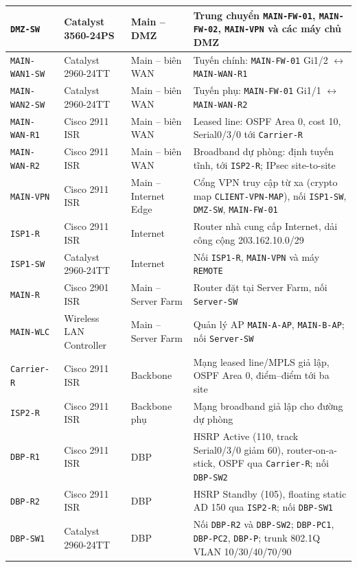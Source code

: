 \begin{small}
\begin{longtable}{|p{2.5cm}|p{2.6cm}|p{2.7cm}|p{6.0cm}|}
\texttt{DMZ-SW} & Catalyst 3560-24PS & Main -- DMZ & Trung chuyển \texttt{MAIN-FW-01}, \texttt{MAIN-FW-02}, \texttt{MAIN-VPN} và các máy chủ DMZ \\ \hline
\texttt{MAIN-WAN1-SW} & Catalyst 2960-24TT & Main -- biên WAN & Tuyến chính: \texttt{MAIN-FW-01} Gi1/2 $\leftrightarrow$ \texttt{MAIN-WAN-R1} \\ \hline
\texttt{MAIN-WAN2-SW} & Catalyst 2960-24TT & Main -- biên WAN & Tuyến phụ: \texttt{MAIN-FW-01} Gi1/1 $\leftrightarrow$ \texttt{MAIN-WAN-R2} \\ \hline
\texttt{MAIN-WAN-R1} & Cisco 2911 ISR & Main -- biên WAN & Leased line: OSPF Area 0, cost 10, Serial0/3/0 tới \texttt{Carrier-R} \\ \hline
\texttt{MAIN-WAN-R2} & Cisco 2911 ISR & Main -- biên WAN & Broadband dự phòng: định tuyến tĩnh, tới \texttt{ISP2-R}; IPsec site-to-site \\ \hline
\texttt{MAIN-VPN} & Cisco 2911 ISR & Main -- Internet Edge & Cổng VPN truy cập từ xa (crypto map \texttt{CLIENT-VPN-MAP}), nối \texttt{ISP1-SW}, \texttt{DMZ-SW}, \texttt{MAIN-FW-01} \\ \hline
\texttt{ISP1-R} & Cisco 2911 ISR & Internet & Router nhà cung cấp Internet, dải công cộng 203.162.10.0/29 \\ \hline
\texttt{ISP1-SW} & Catalyst 2960-24TT & Internet & Nối \texttt{ISP1-R}, \texttt{MAIN-VPN} và máy \texttt{REMOTE} \\ \hline
\texttt{MAIN-R} & Cisco 2901 ISR & Main -- Server Farm & Router đặt tại Server Farm, nối \texttt{Server-SW} \\ \hline
\texttt{MAIN-WLC} & Wireless LAN Controller & Main -- Server Farm & Quản lý AP \texttt{MAIN-A-AP}, \texttt{MAIN-B-AP}; nối \texttt{Server-SW} \\ \hline
\texttt{Carrier-R} & Cisco 2911 ISR & Backbone & Mạng leased line/MPLS giả lập, OSPF Area 0, điểm--điểm tới ba site \\ \hline
\texttt{ISP2-R} & Cisco 2911 ISR & Backbone phụ & Mạng broadband giả lập cho đường dự phòng \\ \hline
\texttt{DBP-R1} & Cisco 2911 ISR & DBP & HSRP Active (110, track Serial0/3/0 giảm 60), router-on-a-stick, OSPF qua \texttt{Carrier-R}; nối \texttt{DBP-SW2} \\ \hline
\texttt{DBP-R2} & Cisco 2911 ISR & DBP & HSRP Standby (105), floating static AD 150 qua \texttt{ISP2-R}; nối \texttt{DBP-SW1} \\ \hline
\texttt{DBP-SW1} & Catalyst 2960-24TT & DBP & Nối \texttt{DBP-R2} và \texttt{DBP-SW2}; \texttt{DBP-PC1}, \texttt{DBP-PC2}, \texttt{DBP-P}; trunk 802.1Q VLAN 10/30/40/70/90 \\ \hline

\end{longtable}
\end{small}
